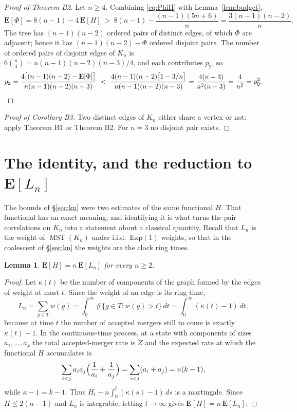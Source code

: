 \documentclass[10pt,a4paper]{amsart}
\newtheorem{lemma}[theorem]{Lemma}
\newcommand{\MST}{\operatorname{MST}}
\newcommand{\E}{\mathbf{E}}
\begin{document}
\begin{proof}[Proof of Theorem B2]
Let $n\ge4$. Combining \eqref{eq:PhiH} with Lemma~\ref{lem:budget},
\begin{equation}
\label{eq:Philower}
\E[\Phi]=8(n-1)-4\,\E[H]\ >\ 8(n-1)-\frac{(n-1)(5n+6)}n=\frac{3(n-1)(n-2)}n .
\end{equation}
The tree has $(n-1)(n-2)$ ordered pairs of distinct edges, of which $\Phi$ are
adjacent; hence it has $(n-1)(n-2)-\Phi$ ordered disjoint pairs. The number of
ordered pairs of disjoint edges of $K_n$ is
$6\binom n4=n(n-1)(n-2)(n-3)/4$, and each contributes $p_2$, so
\[
p_2=\frac{4\bigl[(n-1)(n-2)-\E[\Phi]\bigr]}{n(n-1)(n-2)(n-3)}
\ <\ \frac{4(n-1)(n-2)\bigl[1-3/n\bigr]}{n(n-1)(n-2)(n-3)}
=\frac{4(n-3)}{n^2(n-3)}=\frac4{n^2}=p_0^2 . \qedhere
\]
\end{proof}

\begin{proof}[Proof of Corollary B3]
Two distinct edges of $K_n$ either share a vertex or not; apply Theorem B1 or
Theorem B2. For $n=3$ no disjoint pair exists.
\end{proof}

\section{The identity, and the reduction to \texorpdfstring{$\E[L_n]$}{E[Ln]}}
\label{sec:identity}

The bounds of \S\ref{sec:kn} were two estimates of the same functional $H$. That
functional has an exact meaning, and identifying it is what turns the pair
correlations on $K_n$ into a statement about a classical quantity. Recall that
$L_n$ is the weight of $\MST(K_n)$ under i.i.d.\ $\mathrm{Exp}(1)$ weights, so
that in the coalescent of \S\ref{sec:kn} the weights are the clock ring times.

\begin{lemma}
\label{lem:HeqnL}
$\E[H]=n\,\E[L_n]$ for every $n\ge2$.
\end{lemma}

\begin{proof}
Let $\kappa(t)$ be the number of components of the graph formed by the edges of
weight at most $t$. Since the weight of an edge is its ring time,
\[
L_n=\sum_{g\in T}w(g)=\int_0^\infty\#\{g\in T:w(g)>t\}\,dt
=\int_0^\infty(\kappa(t)-1)\,dt ,
\]
because at time $t$ the number of accepted mergers still to come is exactly
$\kappa(t)-1$. In the continuous-time process, at
a state with components of sizes $a_1,\dots,a_k$ the total accepted-merger rate
is $Z$ and the expected rate at which the functional $H$ accumulates is
\[
\sum_{i<j}a_ia_j\Bigl(\frac1{a_i}+\frac1{a_j}\Bigr)=\sum_{i<j}(a_i+a_j)=n(k-1),
\]
while $\kappa-1=k-1$. Thus $H_t-n\int_0^t(\kappa(s)-1)\,ds$ is a martingale.
Since $H\le2(n-1)$ and $L_n$ is integrable, letting $t\to\infty$ gives
$\E[H]=n\,\E[L_n]$.
\end{proof}
\end{document}
